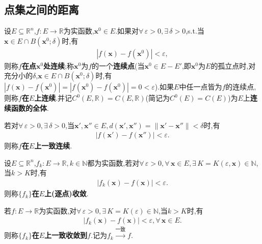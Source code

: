 \documentclass[../../main.tex]{subfiles}%
\begin{document}
\subsection{点集之间的距离}

\begin{definition}
设$E\subseteq\mathbb{R}^n$,$f:E\to\mathbb{R}$为实函数,$\boldsymbol{x}^0\in E$.如果对$\forall\,\varepsilon>0,\exists\,\delta>0$,s.t.当$\boldsymbol{x}\in E\cap B(\boldsymbol{x}^0;\delta)$时,有
\begin{align*}
|f(\boldsymbol{x})-f(\boldsymbol{x}^0)|<\varepsilon,
\end{align*}
则称$f$\textbf{在点$\boldsymbol{x}^0$处连续};称$\boldsymbol{x}^0$为$f$的一个\textbf{连续点}(当$\boldsymbol{x}^0\in E-E'$,即$\boldsymbol{x}^0$为$E$的孤立点时,对充分小的$\delta$,$\boldsymbol{x}\in E\cap B(\boldsymbol{x}^0;\delta)$时,有$|f(\boldsymbol{x})-f(\boldsymbol{x}^0)|=|f(\boldsymbol{x}^0)-f(\boldsymbol{x}^0)|=0<\varepsilon$).如果$E$中任一点皆为$f$的连续点,则称$f$\textbf{在$E$上连续}.并记$C^0(E,\mathbb{R})=C(E,\mathbb{R})$(简记为$C^0(E)=C(E)$)为$E$上\textbf{连续函数的全体}.

若对$\forall\,\varepsilon>0,\exists\,\delta>0$,当$\boldsymbol{x}',\boldsymbol{x}''\in E,d(\boldsymbol{x}',\boldsymbol{x}'')=\|\boldsymbol{x}'-\boldsymbol{x}''\|<\delta$时,有
\begin{align*}
|f(\boldsymbol{x}')-f(\boldsymbol{x}'')|<\varepsilon.
\end{align*}
则称$f$\textbf{在$E$上一致连续}.
\end{definition}

\begin{definition}
设$E\subseteq\mathbb{R}^n$,$f_k:E\to\mathbb{R},k\in \mathbb{N}$都为实函数,若对$\forall\,\varepsilon>0,\forall\,\boldsymbol{x}\in E,\exists\,K=K(\varepsilon,\boldsymbol{x})\in\mathbb{N}$,当$k>K$时,有
\begin{align*}
|f_k(\boldsymbol{x})-f(\boldsymbol{x})|<\varepsilon.
\end{align*}
则称$\{f_k\}$\textbf{在$E$上(逐点)收敛}.

若$f:E\to\mathbb{R}$为实函数,对$\forall\,\varepsilon>0,\exists\,K=K(\varepsilon)\in\mathbb{N}$,当$k>K$时,有
\begin{align*}
|f_k(\boldsymbol{x})-f(\boldsymbol{x})|<\varepsilon,\forall\,\boldsymbol{x}\in E.
\end{align*}
则称$\{f_k\}$\textbf{在$E$上一致收敛到}$f$.记为$f_k\stackrel{\text{一致}}{\to}f.$
\end{definition}
\end{document}

